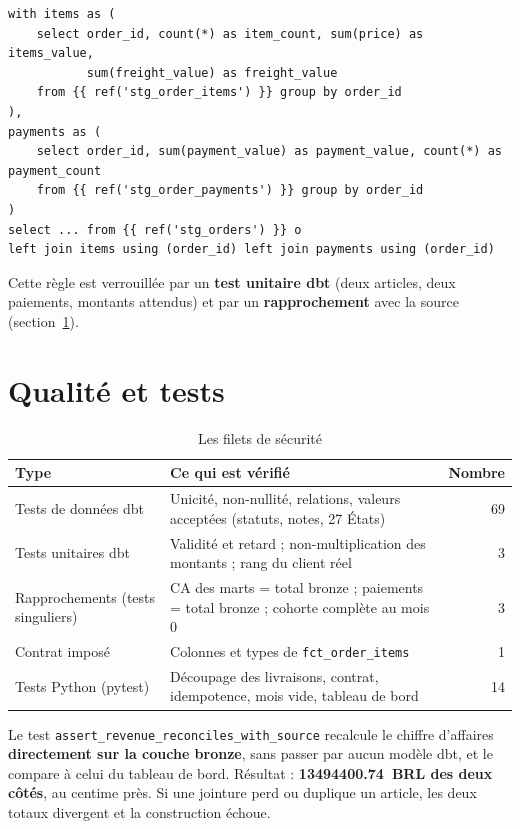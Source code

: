 \documentclass[11pt, a4paper, oneside, headings=normal, numbers=noenddot, DIV=12]{scrartcl}
\begin{document}
\begin{lstlisting}[language=DuckSQL]
with items as (
    select order_id, count(*) as item_count, sum(price) as items_value,
           sum(freight_value) as freight_value
    from {{ ref('stg_order_items') }} group by order_id
),
payments as (
    select order_id, sum(payment_value) as payment_value, count(*) as payment_count
    from {{ ref('stg_order_payments') }} group by order_id
)
select ... from {{ ref('stg_orders') }} o
left join items using (order_id) left join payments using (order_id)
\end{lstlisting}

Cette règle est verrouillée par un \textbf{test unitaire dbt} (deux articles, deux paiements, montants attendus) et par un
\textbf{rapprochement} avec la source (section~\ref{sec:qualite}).

\section{Qualité et tests}\label{sec:qualite}

\begin{table}[H]
\centering\small
\begin{tabularx}{\linewidth}{@{}L{4.4cm} Y r@{}}
\toprule
\textbf{Type} & \textbf{Ce qui est vérifié} & \textbf{Nombre} \\
\midrule
Tests de données dbt & Unicité, non-nullité, relations, valeurs acceptées (statuts, notes, 27 États) & 69 \\
Tests unitaires dbt & Validité et retard ; non-multiplication des montants ; rang du client réel & 3 \\
Rapprochements (tests singuliers) & CA des marts = total bronze ; paiements = total bronze ; cohorte complète au mois 0 & 3 \\
Contrat imposé & Colonnes et types de \texttt{fct\_order\_items} & 1 \\
Tests Python (pytest) & Découpage des livraisons, contrat, idempotence, mois vide, tableau de bord & 14 \\
\bottomrule
\end{tabularx}
\caption{Les filets de sécurité}
\end{table}

\begin{keybox}
Le test \texttt{assert\_revenue\_reconciles\_with\_source} recalcule le chiffre d'affaires \textbf{directement sur la couche bronze}, sans passer
par aucun modèle dbt, et le compare à celui du tableau de bord. Résultat : \textbf{\num{13494400.74}~BRL des deux côtés}, au centime près.
Si une jointure perd ou duplique un article, les deux totaux divergent et la construction échoue.
\end{keybox}
\end{document}
